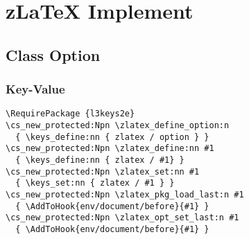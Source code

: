 \chapter{z\LaTeX{} Implement}
\section{Class Option}
\subsection{Key-Value}
\renewcommand{\theFancyVerbLine}{
  \sffamily\textcolor{black}{\oldstylenums{\arabic{FancyVerbLine}}}
}

\begin{verbatim}
\RequirePackage {l3keys2e}
\cs_new_protected:Npn \zlatex_define_option:n
  { \keys_define:nn { zlatex / option } }
\cs_new_protected:Npn \zlatex_define:nn #1
  { \keys_define:nn { zlatex / #1} }
\cs_new_protected:Npn \zlatex_set:nn #1
  { \keys_set:nn { zlatex / #1 } }
\cs_new_protected:Npn \zlatex_pkg_load_last:n #1
  { \AddToHook{env/document/before}{#1} }
\cs_new_protected:Npn \zlatex_opt_set_last:n #1
  { \AddToHook{env/document/before}{#1} }
\end{verbatim}


